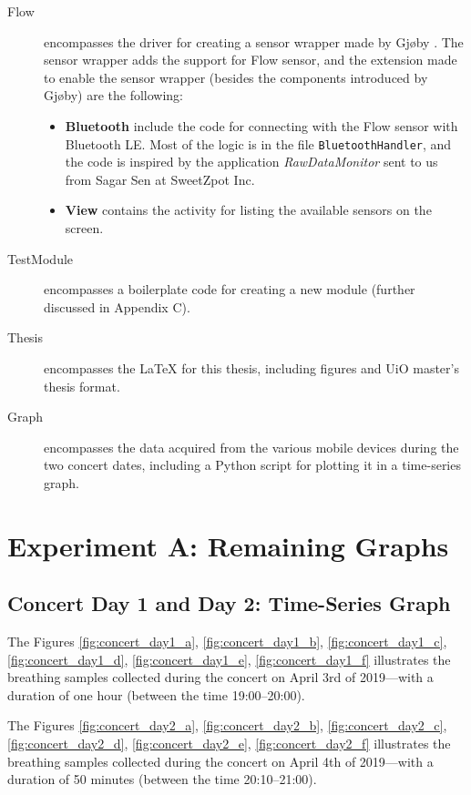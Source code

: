 \begin{description}
    \item[Flow] encompasses the driver for creating a sensor wrapper made by Gjøby \cite{gjoby}. The sensor wrapper adds the support for Flow sensor, and the extension made to enable the sensor wrapper (besides the components introduced by Gjøby) are the following:
    \begin{itemize}
        \item \textbf{Bluetooth} include the code for connecting with the Flow sensor with Bluetooth LE. Most of the logic is in the file \verb|BluetoothHandler|, and the code is inspired by the application \textit{RawDataMonitor} sent to us from Sagar Sen at SweetZpot Inc. 
        \item \textbf{View} contains the activity for listing the available sensors on the screen. 
    \end{itemize}

    \item[TestModule] encompasses a boilerplate code for creating a new module (further discussed in Appendix C).
    \item[Thesis] encompasses the LaTeX for this thesis, including figures and UiO master's thesis format.
    \item[Graph] encompasses the data acquired from the various mobile devices during the two concert dates, including a Python script for plotting it in a time-series graph.

\end{description}

\chapter{Experiment A: Remaining Graphs}

\section{Concert Day 1 and Day 2: Time-Series Graph}
The Figures \ref{fig:concert_day1_a}, \ref{fig:concert_day1_b}, \ref{fig:concert_day1_c}, \ref{fig:concert_day1_d}, \ref{fig:concert_day1_e}, \ref{fig:concert_day1_f} illustrates the breathing samples collected during the concert on April 3rd of 2019---with a duration of one hour (between the time 19:00--20:00). 

The Figures \ref{fig:concert_day2_a}, \ref{fig:concert_day2_b}, \ref{fig:concert_day2_c}, \ref{fig:concert_day2_d}, \ref{fig:concert_day2_e}, \ref{fig:concert_day2_f} illustrates the breathing samples collected during the concert on April 4th of 2019---with a duration of 50 minutes (between the time 20:10--21:00). 

